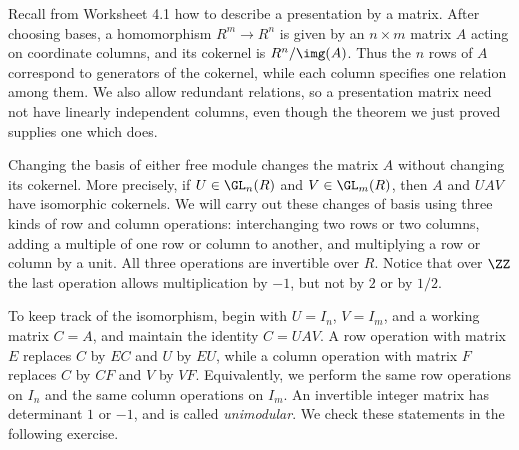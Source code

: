 \documentclass[12pt,reqno]{amsart}
\begin{document}
\hrulefill

Recall from Worksheet 4.1 how to describe a presentation by a matrix. After choosing bases, a homomorphism $R^m\to R^n$ is given by an $n\times m$ matrix $A$ acting on coordinate columns, and its cokernel is $R^n/\img(A)$. Thus the $n$ rows of $A$ correspond to generators of the cokernel, while each column specifies one relation among them. We also allow redundant relations, so a presentation matrix need not have linearly independent columns, even though the theorem we just proved supplies one which does.

Changing the basis of either free module changes the matrix $A$ without changing its cokernel. More precisely, if $U\in\GL_n(R)$ and $V\in\GL_m(R)$, then $A$ and $UAV$ have isomorphic cokernels. We will carry out these changes of basis using three kinds of row and column operations: interchanging two rows or two columns, adding a multiple of one row or column to another, and multiplying a row or column by a unit. All three operations are invertible over $R$. Notice that over $\ZZ$ the last operation allows multiplication by $-1$, but not by $2$ or by $1/2$.

To keep track of the isomorphism, begin with $U=I_n$, $V=I_m$, and a working matrix $C=A$, and maintain the identity $C=UAV$. A row operation with matrix $E$ replaces $C$ by $EC$ and $U$ by $EU$, while a column operation with matrix $F$ replaces $C$ by $CF$ and $V$ by $VF$. Equivalently, we perform the same row operations on $I_n$ and the same column operations on $I_m$. An invertible integer matrix has determinant $1$ or $-1$, and is called \emph{unimodular}. We check these statements in the following exercise.

\hrulefill
\end{document}
